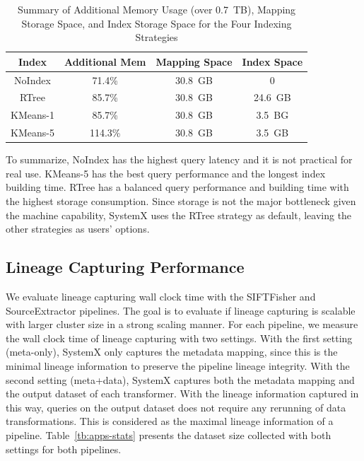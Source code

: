 \documentclass{sig-alternate}
\begin{document}
\begin{table}[t]
\begin{center}
    \caption{Summary of Additional Memory Usage (over 0.7~TB), Mapping Storage Space, and Index Storage Space for the Four Indexing Strategies}
    \begin{scriptsize}
    \begin{tabular}{ | c | c | c | c |}
    \hline
    Index & Additional  Mem & Mapping Space & Index Space \\ \hline \hline
    NoIndex & 71.4\% & 30.8~GB & 0 \\ \hline
    RTree & 85.7\% & 30.8~GB & 24.6~GB\\ \hline
    KMeans-1 & 85.7\% & 30.8~GB & 3.5~BG\\ \hline
    KMeans-5 & 114.3\% & 30.8~GB & 3.5~GB\\ \hline
    \end{tabular}
    \end{scriptsize}
    \label{tb:sift-index-resource}
\end{center}   
\end{table}


To summarize, NoIndex has the highest query latency and it is not practical for real use.
KMeans-5 has the best query performance and the longest index building time.
RTree has a balanced query performance and building time with the highest storage consumption.
Since storage is not the major bottleneck given the machine capability, SystemX uses the RTree strategy
as default, leaving the other strategies as users' options.


\subsection{Lineage Capturing Performance}
We evaluate lineage capturing wall clock time with the SIFTFisher and SourceExtractor pipelines. 
The goal is to evaluate if lineage capturing is scalable with larger cluster size in a strong scaling manner.
For each pipeline, we measure the wall clock time of lineage capturing with two settings.
With the first setting (meta-only), SystemX only captures the metadata mapping, since this is the minimal lineage information 
to preserve the pipeline lineage integrity.
With the second setting (meta+data), SystemX captures both the metadata mapping and the output dataset of each transformer.
With the lineage information captured in this way, queries on the output dataset does not require any rerunning of data transformations.
This is considered as the maximal lineage information of a pipeline. 
Table~\ref{tb:apps-stats} presents the dataset size collected with both settings for both pipelines.
\end{document}
